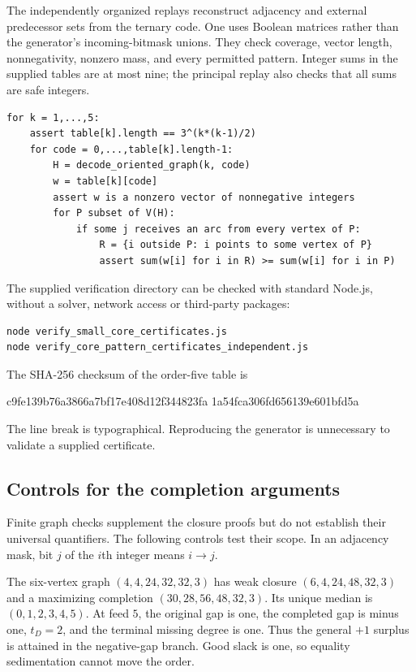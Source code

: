 The independently organized replays reconstruct adjacency and external
predecessor sets from the ternary code. One uses Boolean matrices rather
than the generator's incoming-bitmask unions. They check coverage, vector
length, nonnegativity, nonzero mass, and every permitted pattern. Integer
sums in the supplied tables are at most nine; the principal replay also
checks that all sums are safe integers.

\begin{lstlisting}[caption={Independent certificate verification, pseudocode.},label={alg:paper-verifier}]
for k = 1,...,5:
    assert table[k].length == 3^(k*(k-1)/2)
    for code = 0,...,table[k].length-1:
        H = decode_oriented_graph(k, code)
        w = table[k][code]
        assert w is a nonzero vector of nonnegative integers
        for P subset of V(H):
            if some j receives an arc from every vertex of P:
                R = {i outside P: i points to some vertex of P}
                assert sum(w[i] for i in R) >= sum(w[i] for i in P)
\end{lstlisting}

The supplied verification directory can be checked with standard Node.js,
without a solver, network access or third-party packages:
\begin{lstlisting}
node verify_small_core_certificates.js
node verify_core_pattern_certificates_independent.js
\end{lstlisting}
The SHA-256 checksum of the order-five table is
\begin{center}\small\ttfamily
c9fe139b76a3866a7bf17e408d12f344823fa\linebreak
1a54fca306fd656139e601bfd5a
\end{center}
The line break is typographical. Reproducing the generator is unnecessary
to validate a supplied certificate.

\subsection{Controls for the completion arguments}
Finite graph checks supplement the closure proofs but do not establish
their universal quantifiers. The following controls test their scope.
In an adjacency mask, bit $j$ of the $i$th integer means $i\to j$.

The six-vertex graph $(4,4,24,32,32,3)$ has weak closure
$(6,4,24,48,32,3)$ and a maximizing completion
$(30,28,56,48,32,3)$. Its unique median is $(0,1,2,3,4,5)$.
At feed $5$, the original gap is one, the completed gap is minus one,
$t_D=2$, and the terminal missing degree is one. Thus the general $+1$
surplus is attained in the negative-gap branch. Good slack is one, so
equality sedimentation cannot move the order.


